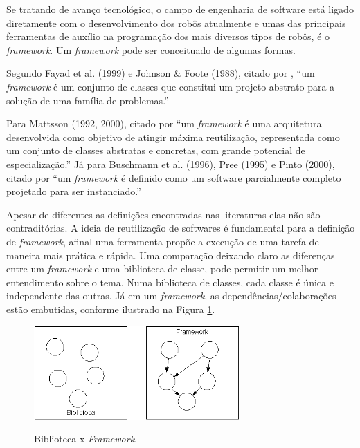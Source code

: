 Se tratando de avanço tecnológico, o campo de engenharia de software está ligado diretamente com o desenvolvimento dos robôs atualmente e umas das principais ferramentas de auxílio na programação dos mais diversos tipos de robôs, é o \textit{framework}. Um \textit{framework} pode ser conceituado de algumas formas.	 

Segundo Fayad et al. (1999) e Johnson \& Foote (1988), citado por , “um \textit{framework }é um conjunto de classes que constitui um projeto abstrato para a solução de uma família de problemas.”

Para Mattsson (1992, 2000), citado por  “um \textit{framework} é uma arquitetura desenvolvida como objetivo de atingir máxima reutilização, representada como um conjunto de classes abstratas e concretas, com grande potencial de especialização.”
Já para Buschmann et al. (1996), Pree (1995) e Pinto (2000), citado por  “um \textit{framework }é definido como um software parcialmente completo projetado para ser instanciado.”

Apesar de diferentes as definições encontradas nas literaturas elas não são contraditórias. A ideia de reutilização de softwares é fundamental para a definição de \textit{framework}, afinal uma ferramenta propõe a execução de uma tarefa de maneira mais prática e rápida. Uma comparação deixando claro as diferenças entre um \textit{framework }e uma biblioteca de classe, pode permitir um melhor entendimento sobre o tema. Numa biblioteca de classes, cada classe é única e independente das outras. Já em um \textit{framework}, as dependências/colaborações estão embutidas, conforme ilustrado na Figura \ref{fig:biblioteca_vs_framework}.

\begin{figure}[H]
	\centering
	\caption{Biblioteca x \textit{Framework}.}
	\includegraphics[width=0.7\textwidth]
	{Figures/biblioteca_vs_framework}
	\label{fig:biblioteca_vs_framework}
\end{figure}

